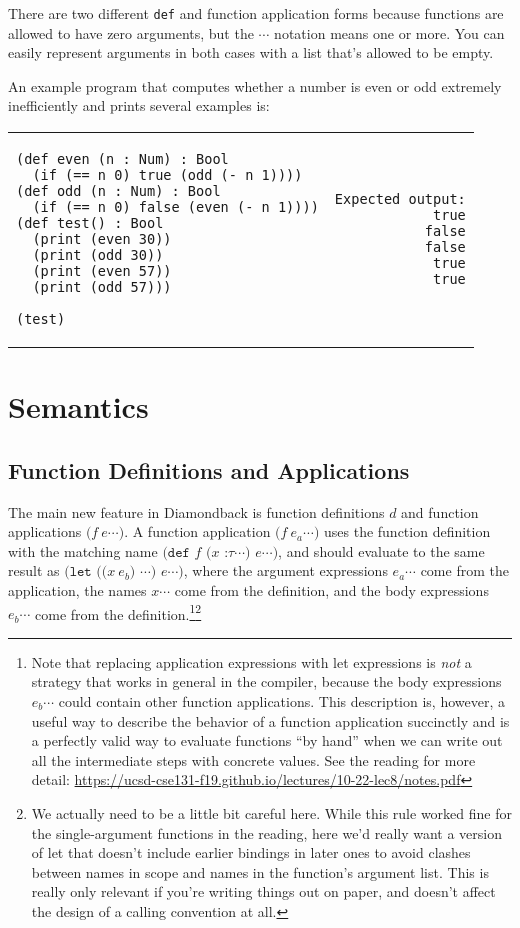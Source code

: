 \documentclass[10pt, oneside]{article}
\begin{document}
There are two different {\tt def} and function application forms because
functions are allowed to have zero arguments, but the $\cdots$ notation means
one or more. You can easily represent arguments in both cases with a list
that's allowed to be empty.

An example program that computes whether a number is even or odd extremely
inefficiently and prints several examples is:

\begin{tabular}{lr}
\begin{lstlisting}
(def even (n : Num) : Bool
  (if (== n 0) true (odd (- n 1))))
(def odd (n : Num) : Bool
  (if (== n 0) false (even (- n 1))))
(def test() : Bool
  (print (even 30))
  (print (odd 30))
  (print (even 57))
  (print (odd 57)))

(test)
\end{lstlisting}
& \hspace{5em}
\begin{lstlisting}
Expected output:
true
false
false
true
true
\end{lstlisting}
\end{tabular}

\section*{Semantics}

\subsection*{Function Definitions and Applications}

The main new feature in Diamondback is function definitions $d$ and function
applications $\texttt{($f\ e\cdots$)}$. A function application $\texttt{($f\
e_a\cdots$)}$ uses the function definition with the matching name
$\texttt{(def $f$ ($x$ :$\tau \cdots$) $e \cdots$)}$, and should evaluate to
the same result as $\texttt{(let (($x\ e_b$) $\cdots$) $e \cdots$)}$, where
the argument expressions $e_a\cdots$ come from the application, the names
$x\cdots$ come from the definition, and the body expressions $e_b\cdots$ come
from the definition.\footnote{Note that replacing application expressions
with let expressions is \emph{not} a strategy that works in general in the
compiler, because the body expressions $e_b\cdots$ could contain other
function applications. This description is, however, a useful way to describe
the behavior of a function application succinctly and is a perfectly valid
way to evaluate functions ``by hand'' when we can write out all the
intermediate steps with concrete values. See the reading for more detail:
\url{https://ucsd-cse131-f19.github.io/lectures/10-22-lec8/notes.pdf}}\footnote{We
actually need to be a little bit careful here. While this rule worked fine
for the single-argument functions in the reading, here we'd really want a
version of let that doesn't include earlier bindings in later ones to avoid
clashes between names in scope and names in the function's argument list.
This is really only relevant if you're writing things out on paper, and
doesn't affect the design of a calling convention at all.}
\end{document}
